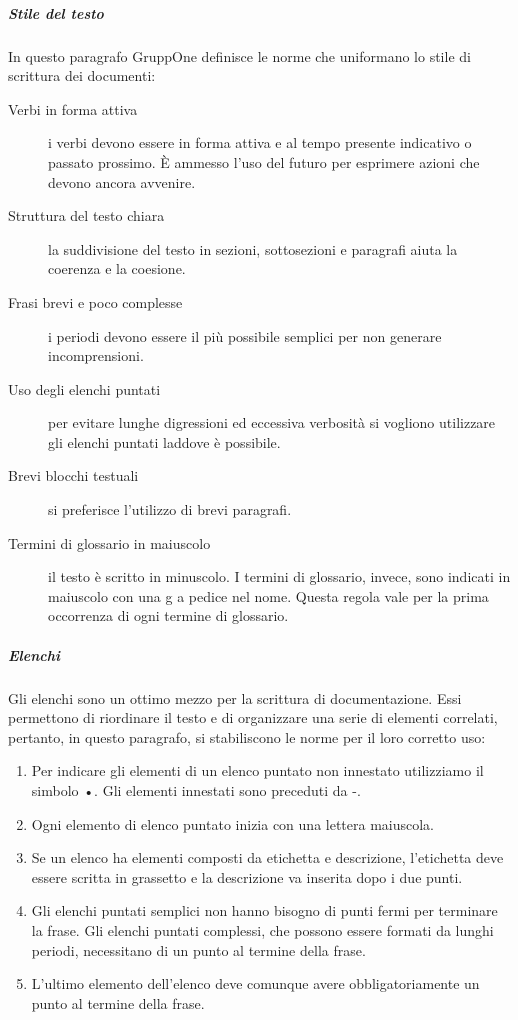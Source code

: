 \documentclass[../../norme-di-progetto.tex]{subfiles}
\begin{document}
\subparagraph{Stile del testo}%
\label{subp:stile_del_testo}
In questo paragrafo GruppOne definisce le norme che uniformano lo stile di scrittura dei documenti:
\begin{description}
  \item [Verbi in forma attiva] i verbi devono essere in forma attiva e al tempo presente indicativo o passato prossimo. È ammesso l'uso del futuro per esprimere azioni che devono ancora avvenire.
  \item [Struttura del testo chiara] la suddivisione del testo in sezioni, sottosezioni e paragrafi aiuta la coerenza e la coesione.
  \item [Frasi brevi e poco complesse] i periodi devono essere il più possibile semplici per non generare incomprensioni.
  \item [Uso degli elenchi puntati] per evitare lunghe digressioni ed eccessiva verbosità si vogliono utilizzare gli elenchi puntati laddove è possibile.
  \item [Brevi blocchi testuali] si preferisce l'utilizzo di brevi paragrafi.
  \item [Termini di glossario in maiuscolo] il testo è scritto in minuscolo. I termini di glossario, invece, sono indicati in maiuscolo con una g a pedice nel nome. Questa regola vale per la prima occorrenza di ogni termine di glossario.
\end{description}

\subparagraph{Elenchi }%
\label{subp:elenchi}
Gli elenchi sono un ottimo mezzo per la scrittura di documentazione. Essi permettono di riordinare il testo e di organizzare una serie di elementi correlati, pertanto, in questo paragrafo, si stabiliscono le norme per il loro corretto uso:

\begin{enumerate}
  \item Per indicare gli elementi di un elenco puntato non innestato utilizziamo il simbolo •. Gli elementi innestati sono preceduti da -.
  \item Ogni elemento di elenco puntato inizia con una lettera maiuscola.
  \item Se un elenco ha elementi composti da etichetta e descrizione, l'etichetta deve essere scritta in grassetto e la descrizione va inserita dopo i due punti.
  \item Gli elenchi puntati semplici non hanno bisogno di punti fermi per terminare la frase. Gli elenchi puntati complessi, che possono essere formati da lunghi periodi, necessitano di un punto al termine della frase.
  \item L'ultimo elemento dell'elenco deve comunque avere obbligatoriamente un punto al termine della frase.
\end{enumerate}
\end{document}
